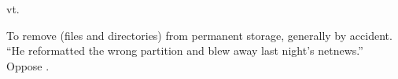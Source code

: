  vt.

To remove (files and directories) from permanent storage, generally by accident.
``He reformatted the wrong partition and blew away last night's netnews.''
Oppose .

